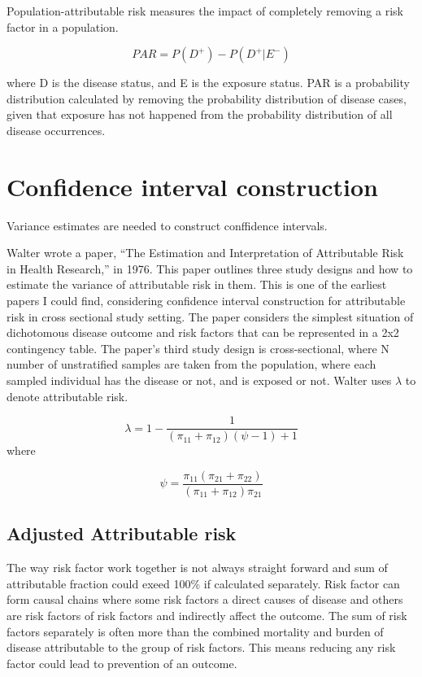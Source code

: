 Population-attributable risk measures the impact of completely removing a risk factor in a population.

\begin{equation} \label{PARequation}
PAR = P(D^+) - P(D^+| E^-)
\end{equation}

where D is the disease status, and E is the exposure status. PAR is a probability distribution calculated by removing the probability distribution of disease cases, given that exposure has not happened from the probability distribution of all disease occurrences. \cite{Pirikahu2016BayesianMO}

\section{Confidence interval construction}\label{FrequentistApproach}
Variance estimates are needed to construct conffidence intervals. \cite{LehnertBatar2006ComparisonOC}

Walter wrote a paper, “The Estimation and Interpretation of Attributable Risk in Health Research,” in 1976. This paper outlines three study designs and how to estimate the variance of attributable risk in them. This is one of the earliest papers I could find, considering confidence interval construction for attributable risk in cross sectional study setting. The paper considers the simplest situation of dichotomous disease outcome and risk factors that can be represented in a 2x2 contingency table. The paper's third study design is cross-sectional, where N number of unstratified samples are taken from the population, where each sampled individual has the disease or not, and is exposed or not. Walter uses $\lambda$ to denote attributable risk.\cite{Walter1976TheEA}

\begin{equation}
    \lambda = 1 - \frac{1}{(\pi_{11} + \pi_{12})(\psi - 1) + 1}
\end{equation}where

\begin{equation}
    \psi = \frac{\pi_{11}(\pi_{21} + \pi_{22})}{(\pi_{11}+\pi_{12})\pi_{21}} 
\end{equation}\cite{Walter1976TheEA}

\subsection{Adjusted Attributable risk}
The way risk factor work together is not always straight forward and sum of attributable fraction could exeed 100\% if calculated separately. \cite{DiMaso2020AttributableFF} Risk factor can form causal chains where some risk factors a direct causes of disease and others are risk factors of risk factors and indirectly affect the outcome. The sum of risk factors separately is often more than the combined mortality and burden of disease attributable to the group of risk factors. This means reducing any risk factor could lead to prevention of an outcome.\cite{WHO2009GlobalHealthRisks}

